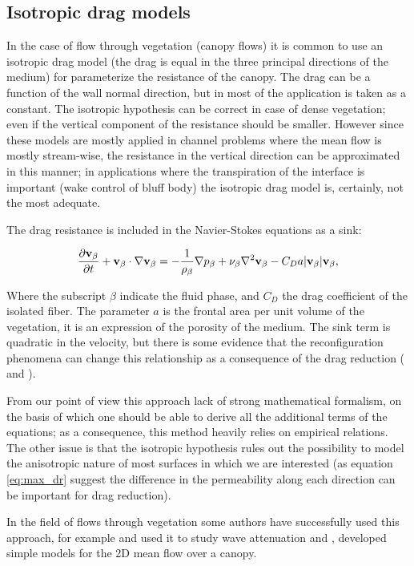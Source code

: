 \subsection{Isotropic drag models}
\label{sec:canopy_eq}

In the case of flow through vegetation (canopy flows) it is common to use an isotropic drag model (the drag is equal in the three principal directions of the medium) for parameterize the resistance of the canopy.
The drag can be a function of the wall normal direction, but in most of the application is taken as a constant.
The isotropic hypothesis can be correct in case of dense vegetation; even if the vertical component of the resistance should be smaller.
However since these models are mostly applied in channel problems where the mean flow is mostly stream-wise, the resistance in the vertical direction can be approximated in this manner; in applications where the transpiration of the interface is important (wake control of bluff body) the isotropic drag model is, certainly, not the most adequate.

The drag resistance is included in the Navier-Stokes equations as a sink:

\begin{equation}
\dfrac{\partial \textbf{v}_{\beta}}{\partial t} + \textbf{v}_{\beta} \cdot \nabla \textbf{v}_{\beta} = -\frac{1}{\rho_{\beta}} \nabla p_{\beta} + \nu_{\beta} \nabla^2 \textbf{v}_{\beta} -C_D a |\textbf{v}_{\beta}| \textbf{v}_{\beta}, 
\label{eq:mom_cd}
\end{equation}

Where the subscript $\beta$ indicate the fluid phase, and $C_D$ the drag coefficient of the isolated fiber.
The parameter $a$ is the frontal area per unit volume of the vegetation, it is an expression of the porosity of the medium.
The sink term is quadratic in the velocity, but there is some evidence that the reconfiguration phenomena can change this relationship as a consequence of the drag reduction (\citet{gosselin2011drag} and \citet{alvarado2017nature}).

From our point of view this approach lack of strong mathematical formalism, on the basis of which one should be able to derive all the additional terms of the equations; as a consequence, this method heavily relies on empirical relations.
The other issue is that the isotropic hypothesis rules out the possibility to model the anisotropic nature of most surfaces in which we are interested (as equation \eqref{eq:max_dr} suggest the difference in the permeability along each direction can be important for drag reduction).

In the field of flows through vegetation some authors have successfully used this approach, for example \citet{maza2013coupled} and \citet{maza2015tsunami} used it to study wave attenuation and \citet{ghisalberti2004limited}, \citet{battiato2014single} developed simple models for the 2D mean flow over a canopy.


